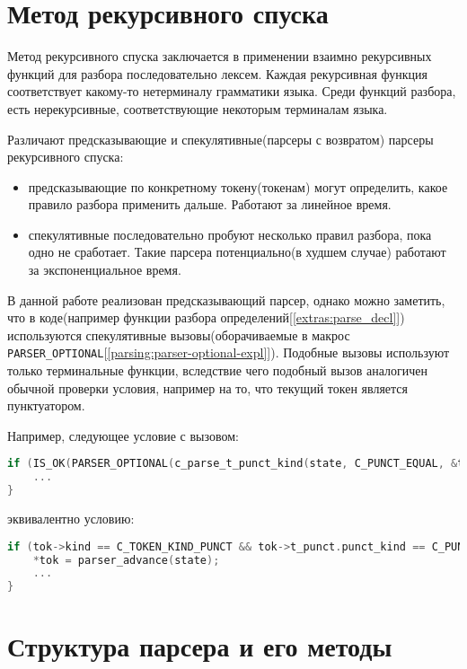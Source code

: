 \section{Метод рекурсивного спуска}
\label{parsing:rec-desc}

Метод рекурсивного спуска заключается в применении взаимно рекурсивных функций для разбора последовательно лексем.
Каждая рекурсивная функция соответствует какому-то нетерминалу грамматики языка.
Среди функций разбора, есть нерекурсивные, соответствующие некоторым терминалам языка.

Различают предсказывающие и спекулятивные(парсеры с возвратом) парсеры рекурсивного спуска:
\begin{itemize}
\item предсказывающие по конкретному токену(токенам) могут определить, какое правило разбора применить дальше. Работают за линейное время.
\item спекулятивные последовательно пробуют несколько правил разбора, пока одно не сработает. Такие парсера потенциально(в худшем случае) работают за экспоненциальное время.
\end{itemize}

В данной работе реализован предсказывающий парсер, однако можно заметить, 
что в коде(например функции разбора определений[\ref{extras:parse_decl}]) используются спекулятивные вызовы(оборачиваемые в макрос \verb|PARSER_OPTIONAL|[\ref{parsing:parser-optional-expl}]).
Подобные вызовы используют только терминальные функции, вследствие чего подобный вызов аналогичен обычной проверки условия, например на то, что текущий токен является пунктуатором.

Например, следующее условие с вызовом:

\begin{lstlisting}[language=c]
if (IS_OK(PARSER_OPTIONAL(c_parse_t_punct_kind(state, C_PUNCT_EQUAL, &tok)))) {
    ...
}
\end{lstlisting}

эквивалентно условию:

\begin{lstlisting}[language=c]
if (tok->kind == C_TOKEN_KIND_PUNCT && tok->t_punct.punct_kind == C_PUNCT_EQUAL) {
    *tok = parser_advance(state);
    ...
}
\end{lstlisting}


\section{Структура парсера и его методы}

